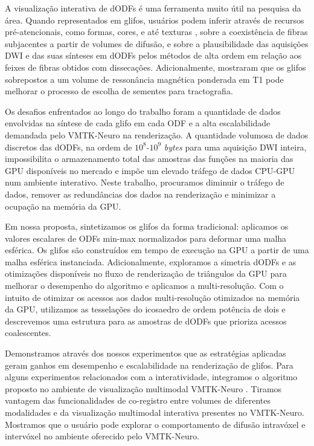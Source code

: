 \documentclass[
    12pt,                %
    oneside,            %
    a4paper,            %
    english,            %
    french,                %
    spanish,            %
    brazil                %
    ]{abntex2}
\begin{document}
A visualização interativa de dODFs é uma ferramenta muito útil na pesquisa da área. Quando representados em glifos, usuários podem inferir através de recursos pré-atencionais, como formas, cores, e até texturas \cite{ware2004}, sobre a coexistência de fibras subjacentes a partir de volumes de difusão, e sobre a plausibilidade das aquisições DWI e das suas sínteses em dODFs pelos métodos de alta ordem em relação aos feixes de fibras obtidos com dissecações. Adicionalmente,  mostraram que os glifos sobrepostos a um volume de ressonância magnética ponderada em T1 pode melhorar o processo de escolha de sementes para tractografia.

Os desafios enfrentados ao longo do trabalho foram a quantidade de dados envolvidas na síntese de cada glifo em cada ODF e a alta escalabilidade demandada pelo VMTK-Neuro na renderização. A quantidade volumosa de dados discretos das dODFs, na ordem de $10^8$-$10^9$ \textit{bytes} para uma aquisição DWI inteira, impossibilita o armazenamento total das amostras das funções na maioria das GPU disponíveis no mercado e impõe um elevado tráfego de dados CPU-GPU num ambiente interativo. Neste trabalho, procuramos diminuir o tráfego de dados, remover as redundâncias dos dados na renderização e minimizar a ocupação na memória da GPU.

Em nossa proposta, sintetizamos os glifos da forma tradicional: aplicamos os valores escalares de ODFs min-max normalizados para deformar uma malha esférica. Os glifos são construídos em tempo de execução na GPU a partir de uma malha esférica instanciada. Adicionalmente, exploramos a simetria dODFs e as otimizações disponíveis no fluxo de renderização de triângulos da GPU para melhorar o desempenho do algoritmo e aplicamos a multi-resolução.
Com o intuito de otimizar os acessos aos dados multi-resolução otimizados na memória da GPU, utilizamos as tesselações do icosaedro de ordem potência de dois e descrevemos uma estrutura para as amostras de dODFs que prioriza acessos coalescentes.

Demonstramos através dos nossos experimentos que as estratégias aplicadas geram ganhos em desempenho e escalabilidade na renderização de glifos. Para alguns experimentos relacionados com a interatividade, 
integramos o algoritmo proposto no ambiente de visualização multimodal VMTK-Neuro \cite{VMTKNeuro}. Tiramos vantagem das funcionalidades de co-registro entre volumes de diferentes modalidades \cite{ting2014} e da visualização multimodal interativa presentes no VMTK-Neuro. Mostramos que o usuário pode explorar o comportamento de difusão intravóxel e intervóxel no ambiente oferecido pelo VMTK-Neuro.
\end{document}
